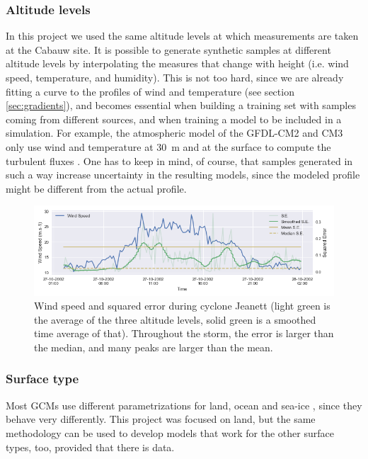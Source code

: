 \documentclass[a4paper,11pt]{kth-mag}
\begin{document}
\subsubsection{Altitude levels} In this project we used the same altitude levels at which measurements are taken at the Cabauw site. It is possible to generate synthetic samples at different altitude levels by interpolating the measures that change with height (i.e. wind speed, temperature, and humidity). This is not too hard, since we are already fitting a curve to the profiles of wind and temperature (see section \ref{sec:gradients}), and becomes essential when building a training set with samples coming from different sources, and when training a model to be included in a simulation. For example, the atmospheric model of the GFDL-CM2 and CM3 only use wind and temperature at \SI{30}{\meter} and at the surface to compute the turbulent fluxes \citep{gfdl_am2}. One has to keep in mind, of course, that samples generated in such a way increase uncertainty in the resulting models, since the modeled profile might be different from the actual profile.

\begin{figure}
    \centering
    \includegraphics[width=\textwidth]{images/jeanett_error}
    \caption{Wind speed and squared error during cyclone Jeanett (light green is the average of the three altitude levels, solid green is a smoothed time average of that). Throughout the storm, the error is larger than the median, and many peaks are larger than the mean.}
    \label{fig:jeanett_error}
\end{figure}


\subsubsection{Surface type} Most GCMs use different parametrizations for land, ocean and sea-ice \citep{gfdl_am2,gfdl_am3,hadcm3}, since they behave very differently. This project was focused on land, but the same methodology can be used to develop models that work for the other surface types, too, provided that there is data.
\end{document}
